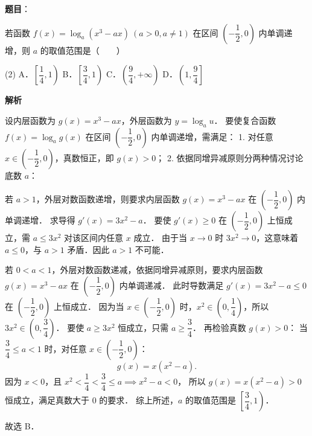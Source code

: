 \begin{answer}

\textbf{题目}：

若函数 $f(x) = \log_a(x^3 - ax)\ (a > 0, a \neq 1)$ 在区间 $\left(-\dfrac{1}{2}, 0\right)$ 内单调递增，则 $a$ 的取值范围是\mbox{（　　）}

\begin{gkopts}(2)
\task A．$\left[\dfrac{1}{4}, 1\right)$
\task B．$\left[\dfrac{3}{4}, 1\right)$
\task C．$\left(\dfrac{9}{4}, +\infty\right)$
\task D．$\left(1, \dfrac{9}{4}\right]$
\end{gkopts}

\textbf{解析}

设内层函数为 $g(x) = x^3 - ax$，外层函数为 $y = \log_a u$．
要使复合函数 $f(x) = \log_a g(x)$ 在区间 $\left(-\dfrac{1}{2}, 0\right)$ 内单调递增，需满足：
1. 对任意 $x \in \left(-\dfrac{1}{2}, 0\right)$，真数恒正，即 $g(x) > 0$；
2. 依据同增异减原则分两种情况讨论底数 $a$：

若 $a > 1$，外层对数函数递增，则要求内层函数 $g(x) = x^3 - ax$ 在 $\left(-\dfrac{1}{2}, 0\right)$ 内单调递增．
求导得 $g'(x) = 3x^2 - a$．
要使 $g'(x) \geqslant 0$ 在 $\left(-\dfrac{1}{2}, 0\right)$ 上恒成立，需 $a \leqslant 3x^2$ 对该区间内任意 $x$ 成立．
由于当 $x \to 0$ 时 $3x^2 \to 0$，这意味着 $a \leqslant 0$，与 $a > 1$ 矛盾．因此 $a > 1$ 不可能．

若 $0 < a < 1$，外层对数函数递减，依据同增异减原则，要求内层函数 $g(x) = x^3 - ax$ 在 $\left(-\dfrac{1}{2}, 0\right)$ 内单调递减．
此时导数满足 $g'(x) = 3x^2 - a \leqslant 0$ 在 $\left(-\dfrac{1}{2}, 0\right)$ 上恒成立．
因为当 $x \in \left(-\dfrac{1}{2}, 0\right)$ 时，$x^2 \in \left(0, \dfrac{1}{4}\right)$，所以 $3x^2 \in \left(0, \dfrac{3}{4}\right)$．
要使 $a \geqslant 3x^2$ 恒成立，只需 $a \geqslant \dfrac{3}{4}$．
再检验真数 $g(x) > 0$：
当 $\dfrac{3}{4} \leqslant a < 1$ 时，对任意 $x \in \left(-\dfrac{1}{2}, 0\right)$：
\nopagebreak[4]
\[
g(x) = x(x^2 - a).
\]
因为 $x < 0$，且 $x^2 < \dfrac{1}{4} < \dfrac{3}{4} \leqslant a \implies x^2 - a < 0$，
所以 $g(x) = x(x^2 - a) > 0$ 恒成立，满足真数大于 $0$ 的要求．
综上所述，$a$ 的取值范围是 $\left[\dfrac{3}{4}, 1\right)$．

故选 B．


\end{answer}

